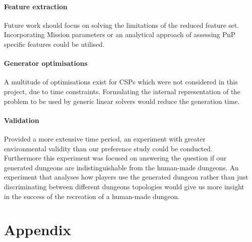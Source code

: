 \documentclass{UoYCSproject}
\begin{document}
\subsubsection{Feature extraction}
Future work should focus on solving the limitations of the reduced feature set. Incorporating Mission parameters or an analytical approach of assessing PnP specific features could be utilised.

\subsubsection{Generator optimisations}
A multitude of optimisations exist for CSPs which were not considered in this project, due to time constraints. Formulating the internal representation of the problem to be used by generic linear solvers would reduce the generation time.

\subsubsection{Validation}
Provided a more extensive time period, an experiment with greater environmental validity than our preference study could be conducted.
Furthermore this experiment was focused on answering the question if our generated dungeons are indistinguishable from the human-made dungeons. An experiment that analyses how players use the generated dungeon rather than just discriminating between different dungeons topologies would give us more insight in the success of the recreation of a human-made dungeon.

\appendix
\chapter{Appendix}
\label{cha:aA}
\end{document}
